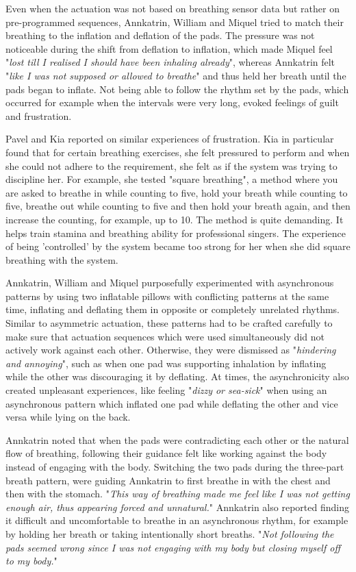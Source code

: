 Even when the actuation was not based on breathing sensor data but rather on pre-programmed sequences, Annkatrin, William and Miquel tried to match their breathing to the inflation and deflation of the pads. The pressure was not noticeable during the shift from deflation to inflation, which made Miquel feel "\textit{lost till I realised I should have been inhaling already}", whereas Annkatrin felt "\textit{like I was not supposed or allowed to breathe}" and thus held her breath until the pads began to inflate. Not being able to follow the rhythm set by the pads, which occurred for example when the intervals were very long, evoked feelings of guilt and frustration.

Pavel and Kia reported on similar experiences of frustration. Kia in particular found that for certain breathing exercises, she felt pressured to perform and when she could not adhere to the requirement, she felt as if the system was trying to discipline her. For example, she tested "square breathing", a method where you are asked to breathe in while counting to five, hold your breath while counting to five, breathe out while counting to five and then hold your breath again, and then increase the counting, for example, up to 10. The method is quite demanding. It helps train stamina and breathing ability for professional singers. The experience of being 'controlled' by the system became too strong for her when she did square breathing with the system.   

Annkatrin, William and Miquel purposefully experimented with asynchronous patterns by using two inflatable pillows with conflicting patterns at the same time, inflating and deflating them in opposite or completely unrelated rhythms. Similar to asymmetric actuation, these patterns had to be crafted carefully to make sure that actuation sequences which were used simultaneously did not actively work against each other. Otherwise, they were dismissed as "\textit{hindering and annoying}", such as when one pad was supporting inhalation by inflating while the other was discouraging it by deflating. At times, the asynchronicity also created unpleasant experiences, like feeling "\textit{dizzy or sea-sick}" when using an asynchronous pattern which inflated one pad while deflating the other and vice versa while lying on the back.

Annkatrin noted that when the pads were contradicting each other or the natural flow of breathing, following their guidance felt like working against the body instead of engaging with the body. Switching the two pads during the three-part breath pattern, were guiding Annkatrin to first breathe in with the chest and then with the stomach. "\textit{This way of breathing made me feel like I was not getting enough air, thus appearing forced and unnatural.}" Annkatrin also reported finding it difficult and uncomfortable to breathe in an asynchronous rhythm, for example by holding her breath or taking intentionally short breaths. "\textit{Not following the pads seemed wrong since I was not engaging with my body but closing myself off to my body.}"


